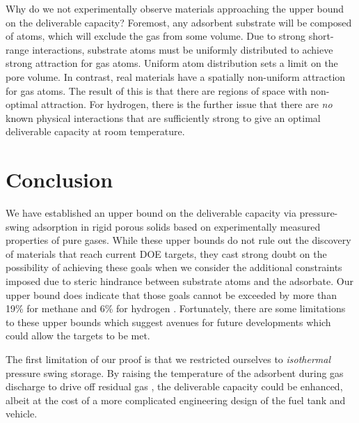 Why do we not experimentally observe materials approaching the upper bound on the deliverable capacity? Foremost, any adsorbent substrate will be composed of atoms, which will exclude the gas from some volume. Due to strong short-range interactions, substrate atoms must be uniformly distributed to achieve strong attraction for gas atoms. Uniform atom distribution sets a limit on the pore volume.
In contrast, real materials have a spatially non-uniform attraction for gas atoms. The result of this is that there are regions of space with non-optimal attraction. For hydrogen, there is the further issue that there are \emph{no} known physical interactions that are sufficiently strong to give an optimal deliverable capacity at room temperature.

\section{Conclusion}
We have established an upper bound on the deliverable capacity via pressure-swing adsorption in rigid porous solids based on experimentally measured properties of pure gases. While these upper bounds do not rule out the discovery of materials that reach current DOE targets, they cast strong doubt on the possibility of achieving these goals when we consider the additional constraints imposed due to steric hindrance between substrate atoms and the adsorbate. Our upper bound does indicate that those goals cannot be exceeded by more than 19\% for methane and 6\% for hydrogen . Fortunately, there are some limitations to these upper bounds which suggest avenues for future developments which could allow the targets to be met.

The first limitation of our proof is that we restricted ourselves to \emph{isothermal} pressure swing storage. By raising the temperature of the adsorbent during gas discharge to drive off residual gas \cite{gomez2014exploring}, the deliverable capacity could be enhanced, albeit at the cost of a more complicated engineering design of the fuel tank and vehicle.

